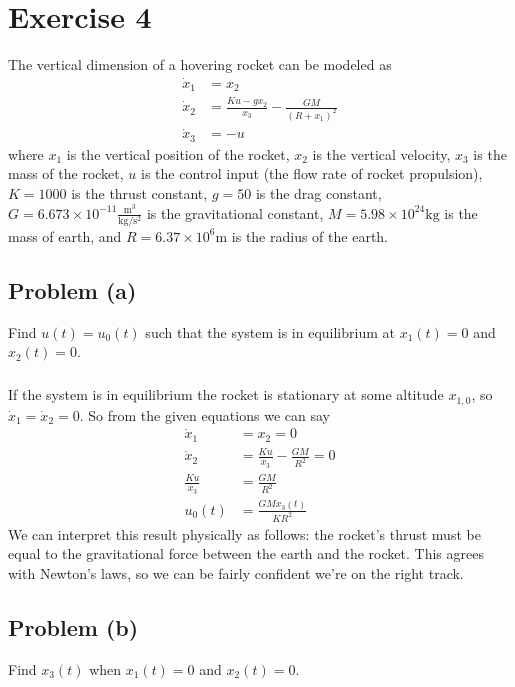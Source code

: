 \documentclass[11pt]{article}
\begin{document}
\section*{Exercise 4}
The vertical dimension of a hovering rocket can be modeled as
\begin{align*}
	\dot{x}_1 &= x_2 \\
	\dot{x}_2 &= \frac{Ku-gx_2}{x_3} - \frac{GM}{(R+x_1)^2} \\
	\dot{x}_3 &= -u
\end{align*}
where $x_1$ is the vertical position of the rocket, $x_2$ is the vertical velocity, $x_3$ is the mass of the rocket, $u$ is the control input (the flow rate of rocket propulsion), $K=1000$ is the thrust constant, $g=50$ is the drag constant, $G=6.673\times10^{-11}\frac{\text{m}^3}{\text{kg}/\text{s}^2}$ is the gravitational constant, $M=5.98\times10^{24}\text{kg}$ is the mass of earth, and $R=6.37\times10^6\text{m}$ is the radius of the earth.

\subsection*{Problem (a)}
Find $u(t)=u_0(t)$ such that the system is in equilibrium at $x_1(t)=0$ and $x_2(t)=0$.

\subparagraph*{}
If the system is in equilibrium the rocket is stationary at some altitude $x_{1,0}$, so $\dot{x}_1 = \dot{x}_2 = 0$. So from the given equations we can say
\begin{align*}
	\dot{x}_1 &= x_2 = 0 \\
	\dot{x}_2 &= \frac{Ku}{x_3} - \frac{GM}{R^2} = 0\\
	\frac{Ku}{x_3} &= \frac{GM}{R^2} \\
	u_0(t) &= \frac{GMx_3(t)}{KR^2}
\end{align*}
We can interpret this result physically as follows: the rocket's thrust must be equal to the gravitational force between the earth and the rocket. This agrees with Newton's laws, so we can be fairly confident we're on the right track. 

\subsection*{Problem (b)}
Find $x_3(t)$ when $x_1(t)=0$ and $x_2(t)=0$.
\end{document}
